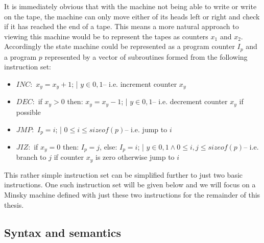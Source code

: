 It is immediately obvious that with the machine not being able to write or write on the tape, the machine can only move either of its heads left or right and check if it has reached the end of a tape. This means a more natural approach to viewing this machine would be to represent the tapes as counters $x_1$ and $x_2$. Accordingly the state machine could be represented as a program counter $I_p$ and a program $p$ represented by a vector of subroutines formed from the following instruction set:
\begin{instructionset}
\label{minsky4instruction}
\begin{itemize}
\hfill
\item{$INC:$} $x_y = x_y + 1$; | $ y\in{0,1}$\hfill\break -- i.e. increment counter $x_y$
\item{$DEC:$} if $x_y > 0$ then: $x_y = x_y - 1$; | $ y\in{0,1}$\hfill\break -- i.e. decrement counter $x_y$ if possible
\item{$JMP:$} $I_p = i$; | $ 0 \leq i \leq sizeof(p)$\hfill\break -- i.e. jump to $i$
\item{$JIZ:$} if $x_y=0$ then: $ I_p = j$, else: $I_p = i$; | $y\in{0,1} \land 0 \leq i,j \leq sizeof(p)$\hfill\break -- i.e. branch to $j$ if counter $x_y$ is zero otherwise jump to $i$
\end{itemize}
\end{instructionset}
This rather simple instruction set can be simplified further to just two basic instructions. One such instruction set will be given below and we will focus on a Minsky machine defined with just these two instructions for the remainder of this thesis.

\subsection{Syntax and semantics}

